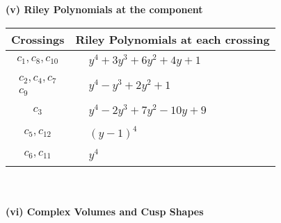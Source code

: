 \documentclass[1p]{elsarticle_modified}
\theoremstyle{definition}
\begin{document}
\newpage\renewcommand{\arraystretch}{1}
\flushleft \textbf{(v) Riley Polynomials at the component}\newline \\
\begin{tabular}{m{50pt}|m{274pt}}
Crossings & \hspace{64pt}Riley Polynomials at each crossing \\
\hline $$\begin{aligned}c_{1},c_{8},c_{10}\end{aligned}$$&$\begin{aligned}
&y^4+3 y^3+6 y^2+4 y+1
\end{aligned}$\\
\hline $$\begin{aligned}c_{2},c_{4},c_{7}\\c_{9}\end{aligned}$$&$\begin{aligned}
&y^4- y^3+2 y^2+1
\end{aligned}$\\
\hline $$\begin{aligned}c_{3}\end{aligned}$$&$\begin{aligned}
&y^4-2 y^3+7 y^2-10 y+9
\end{aligned}$\\
\hline $$\begin{aligned}c_{5},c_{12}\end{aligned}$$&$\begin{aligned}
&(y-1)^4
\end{aligned}$\\
\hline $$\begin{aligned}c_{6},c_{11}\end{aligned}$$&$\begin{aligned}
&y^4
\end{aligned}$\\
\hline
\end{tabular}\\~\\
\newpage\flushleft \textbf{(vi) Complex Volumes and Cusp Shapes}
\end{document}

